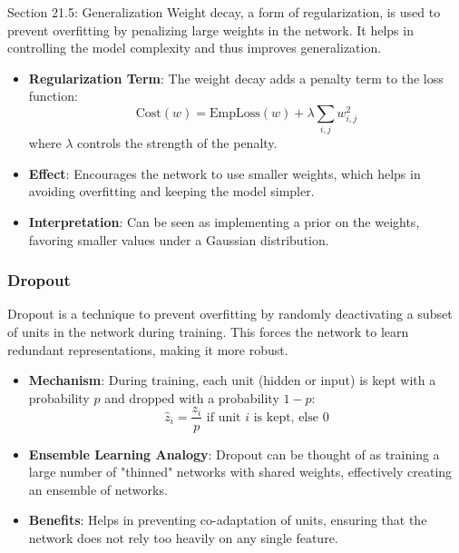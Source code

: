 \begin{notes}{Section 21.5: Generalization}
    Weight decay, a form of regularization, is used to prevent overfitting by penalizing large weights in the network. It helps in controlling the model complexity and thus improves generalization.
    
    \begin{highlight}
    
        \begin{itemize}
            \item \textbf{Regularization Term}: The weight decay adds a penalty term to the loss function:
            \[
            \text{Cost}(w) = \text{EmpLoss}(w) + \lambda \sum_{i,j} w_{i,j}^2
            \]
            where $\lambda$ controls the strength of the penalty.
            \item \textbf{Effect}: Encourages the network to use smaller weights, which helps in avoiding overfitting and keeping the model simpler.
            \item \textbf{Interpretation}: Can be seen as implementing a prior on the weights, favoring smaller values under a Gaussian distribution.
        \end{itemize}
    
    \end{highlight}
    
    \subsubsection*{Dropout}
    
    Dropout is a technique to prevent overfitting by randomly deactivating a subset of units in the network during training. This forces the network to learn redundant representations, making it more robust.
    
    \begin{highlight}[Dropout]
    
        \begin{itemize}
            \item \textbf{Mechanism}: During training, each unit (hidden or input) is kept with a probability $p$ and dropped with a probability $1 - p$:
            \[
            \hat{z}_i = \frac{z_i}{p} \text{ if unit } i \text{ is kept, else } 0
            \]
            \item \textbf{Ensemble Learning Analogy}: Dropout can be thought of as training a large number of "thinned" networks with shared weights, effectively creating an ensemble of networks.
            \item \textbf{Benefits}: Helps in preventing co-adaptation of units, ensuring that the network does not rely too heavily on any single feature.
        \end{itemize}
    

\end{highlight}
\end{notes}
